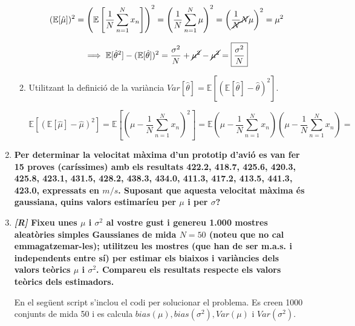 \documentclass[a4paper]{article}
\begin{document}
\begin{enumerate}
\begin{enumerate}
    $$ (\mathbb{E}[\hat{\mu}])^2 = \left(\mathbb{E}\left[\frac{1}{N}\sum_{n=1}^{N}x_n\right]\right)^2 = \left(\frac{1}{N}\sum_{n=1}^{N}\mu\right)^2 = \left(\frac{1}{\cancel{N}} \cancel{N} \mu\right)^2 = \mu^2 $$
    
    $$ \implies  \mathbb{E}[\hat{\theta}^2] - (\mathbb{E}[\hat{\theta}])^2  = \frac{\sigma^2}{N}+\cancel{\mu^2} - \cancel{\mu^2} = \boxed{\frac{\sigma^2}{N}} $$
    
    \item Utilitzant la definició de la variància $Var[\hat{\theta}] = \mathbb{E}[(\mathbb{E}[\hat{\theta}] - \hat{\theta})^2]$.
    
    $$ \mathbb{E}[(\mathbb{E}[\hat{\mu}]-\hat{\mu})^2] = \mathbb{E}[(\mu-\frac{1}{N}\sum_{n=1}^{N}x_n)^2] = \mathbb{E}(\mu-\frac{1}{N}\sum_{n=1}^{N}x_n)(\mu-\frac{1}{N}\sum_{n=1}^{N}x_n) = $$    
\end{enumerate}

\item \textbf{Per determinar la velocitat màxima d'un prototip d'avió es van fer 15 proves (caríssimes) amb els resultats 422.2, 418.7, 425.6, 420.3, 425.8, 423.1, 431.5, 428.2, 438.3, 434.0, 411.3, 417.2, 413.5, 441.3, 423.0, expressats en $m/s$. Suposant que aquesta velocitat màxima és gaussiana, quins valors estimaríeu per $\mu$ i per $\sigma$?}

\item \textbf{\emph{[R]} Fixeu unes $ \mu $ i $ \sigma^2 $ al vostre gust i genereu 1.000 mostres aleatòries simples Gaussianes de mida $ N = 50 $ (noteu que no cal emmagatzemar-les); utilitzeu les mostres (que han de ser m.a.s. i independents entre sí) per estimar els biaixos i variàncies dels valors teòrics $ \mu $ i $ \sigma^2 $. Compareu els resultats respecte els valors teòrics dels estimadors.}

En el següent script s'inclou el codi per solucionar el problema. Es creen 1000 conjunts de mida 50 i es calcula $ bias(\mu), bias(\sigma^2), Var(\mu)\text{ i } Var(\sigma^2)$.



\end{enumerate}
\end{document}
